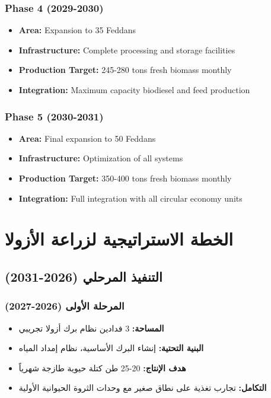 \subsubsection{Phase 4 (2029-2030)}
\begin{itemize}
    \item \textbf{Area:} Expansion to 35 Feddans
    \item \textbf{Infrastructure:} Complete processing and storage facilities
    \item \textbf{Production Target:} 245-280 tons fresh biomass monthly
    \item \textbf{Integration:} Maximum capacity biodiesel and feed production
\end{itemize}

\subsubsection{Phase 5 (2030-2031)}
\begin{itemize}
    \item \textbf{Area:} Final expansion to 50 Feddans
    \item \textbf{Infrastructure:} Optimization of all systems
    \item \textbf{Production Target:} 350-400 tons fresh biomass monthly
    \item \textbf{Integration:} Full integration with all circular economy units
\end{itemize}

\section{الخطة الاستراتيجية لزراعة الأزولا}

\subsection{التنفيذ المرحلي (2026-2031)}

\subsubsection{المرحلة الأولى (2026-2027)}
\begin{itemize}
    \item \textbf{المساحة:} 3 فدادين نظام برك أزولا تجريبي
    \item \textbf{البنية التحتية:} إنشاء البرك الأساسية، نظام إمداد المياه
    \item \textbf{هدف الإنتاج:} 20-25 طن كتلة حيوية طازجة شهرياً
    \item \textbf{التكامل:} تجارب تغذية على نطاق صغير مع وحدات الثروة الحيوانية الأولية
\end{itemize}

